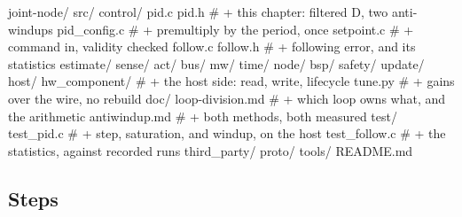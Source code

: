 \begin{plaincode}
joint-node/
  src/
    control/
      pid.c pid.h              # + this chapter: filtered D, two anti-windups
      pid_config.c             # + premultiply by the period, once
      setpoint.c               # + command in, validity checked
      follow.c follow.h        # + following error, and its statistics
    estimate/ sense/ act/ bus/ mw/ time/ node/ bsp/ safety/ update/
  host/
    hw_component/              # + the host side: read, write, lifecycle
    tune.py                    # + gains over the wire, no rebuild
  doc/
    loop-division.md           # + which loop owns what, and the arithmetic
    antiwindup.md              # + both methods, both measured
  test/
    test_pid.c                 # + step, saturation, and windup, on the host
    test_follow.c              # + the statistics, against recorded runs
  third_party/  proto/  tools/  README.md
\end{plaincode}

\subsection*{Steps}

